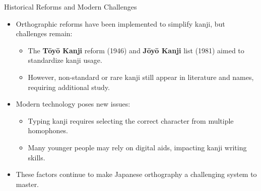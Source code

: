 \documentclass[xetex]{beamer}
\begin{document}
\begin{frame}{Historical Reforms and Modern Challenges}
\begin{itemize}
    \item Orthographic reforms have been implemented to simplify kanji, but challenges remain:
    \begin{itemize}
        \item The \textbf{Tōyō Kanji} reform (1946) and \textbf{Jōyō Kanji} list (1981) aimed to standardize kanji usage.
        \item However, non-standard or rare kanji still appear in literature and names, requiring additional study.
    \end{itemize}
    \item Modern technology poses new issues:
    \begin{itemize}
        \item Typing kanji requires selecting the correct character from multiple homophones.
        \item Many younger people may rely on digital aids, impacting kanji writing skills.
    \end{itemize}
    \item These factors continue to make Japanese orthography a challenging system to master.
\end{itemize}
\end{frame}
\end{document}
